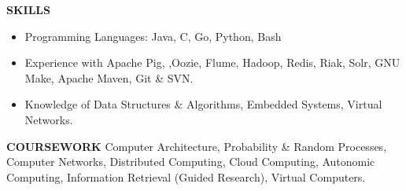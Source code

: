 \documentclass[10pt, letterpaper]{article}
\begin{document}
\textbf{SKILLS}
\smallskip 
\begin{itemize}
    \item Programming Languages: Java, C, Go, Python, Bash
    \item Experience with Apache Pig, ,Oozie, Flume, Hadoop, Redis, Riak, Solr, GNU Make, Apache Maven, Git \& SVN.
    \item Knowledge of Data Structures \& Algorithms, Embedded Systems, Virtual Networks.
\end{itemize} 

\textbf{COURSEWORK}
\smallskip 
\newline
Computer Architecture, Probability \& Random Processes, Computer Networks, 
Distributed Computing, Cloud Computing, Autonomic Computing, Information Retrieval (Guided Research), Virtual Computers.
\end{document}
